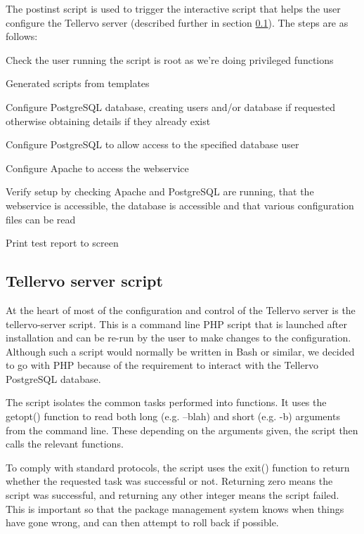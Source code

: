 The postinst script is used to trigger the interactive script that helps the user configure the Tellervo server (described further in section \ref{txt:tellervo-server-script}).  The steps are as follows:  

\begin{itemize*}
 \item Check the user running the script is root as we're doing privileged functions
 \item Generated scripts from templates
 \item Configure PostgreSQL database, creating users and/or database if requested otherwise obtaining details if they already exist
 \item Configure PostgreSQL to allow access to the specified database user
 \item Configure Apache to access the webservice
 \item Verify setup by checking Apache and PostgreSQL are running, that the webservice is accessible, the database is accessible and that various configuration files can be read
 \item Print test report to screen
\end{itemize*}

\subsection{Tellervo server script}
\label{txt:tellervo-server-script}

At the heart of most of the configuration and control of the Tellervo server is the tellervo-server script.  This is a command line PHP script that is launched after installation and can be re-run by the user to make changes to the configuration.  Although such a script would normally be written in Bash or similar, we decided to go with PHP because of the requirement to interact with the Tellervo PostgreSQL database.  

The script isolates the common tasks performed into functions.  It uses the getopt() function to read both long (e.g. --blah) and short (e.g. -b) arguments from the command line.  These depending on the arguments given, the script then calls the relevant functions.

To comply with standard protocols, the script uses the exit() function to return whether the requested task was successful or not.  Returning zero means the script was successful, and returning any other integer means the script failed.  This is important so that the package management system knows when things have gone wrong, and can then attempt to roll back if possible.

